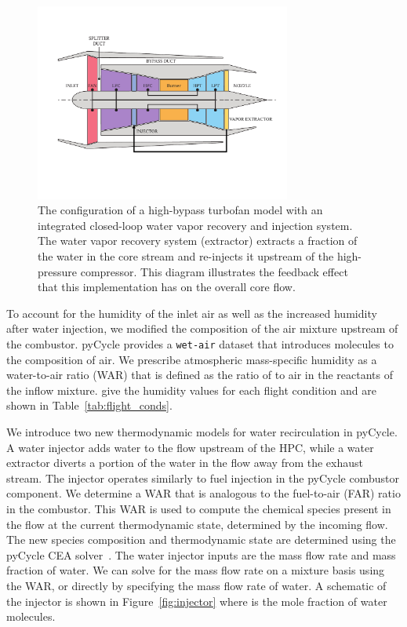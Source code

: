 \documentclass[conf]{new-aiaa}
\begin{document}
\begin{figure}[hbt!]
  \centering
  \includegraphics[width=0.75\textwidth]{turbofan_wvr.pdf}
  \caption{
    The configuration of a high-bypass turbofan model with an integrated closed-loop water vapor recovery and injection system.
    The water vapor recovery system (extractor) extracts a fraction of the water in the core stream and re-injects it upstream of the high-pressure compressor.
    This diagram illustrates the feedback effect that this implementation has on the overall core flow.}
  \label{fig:n3_cycle}
\end{figure}

To account for the humidity of the inlet air as well as the increased humidity after water injection, we modified the composition of the air mixture upstream of the combustor.
pyCycle provides a \texttt{wet-air} dataset that introduces  molecules to the composition of air.
We prescribe atmospheric mass-specific humidity as a water-to-air ratio (WAR) that is defined as the ratio of  to air in the reactants of the inflow mixture.
\citet{Kalnay1996} give the humidity values for each flight condition and are shown in Table~\ref{tab:flight_conds}.

We introduce two new thermodynamic models for water recirculation in pyCycle.
A water injector adds water to the flow upstream of the HPC, while a water extractor diverts a portion of the water in the flow away from the exhaust stream.
The injector operates similarly to fuel injection in the pyCycle combustor component.
We determine a WAR that is analogous to the fuel-to-air (FAR) ratio in the combustor.
This WAR is used to compute the chemical species present in the flow at the current thermodynamic state, determined by the incoming flow.
The new species composition and thermodynamic state are determined using the pyCycle CEA solver~\cite{Gray2017b}.
The water injector inputs are the mass flow rate and mass fraction of water.
We can solve for the mass flow rate on a mixture basis using the WAR, or directly by specifying the mass flow rate of water.
A schematic of the injector is shown in Figure~\ref{fig:injector} where  is the mole fraction of water molecules.
\end{document}
